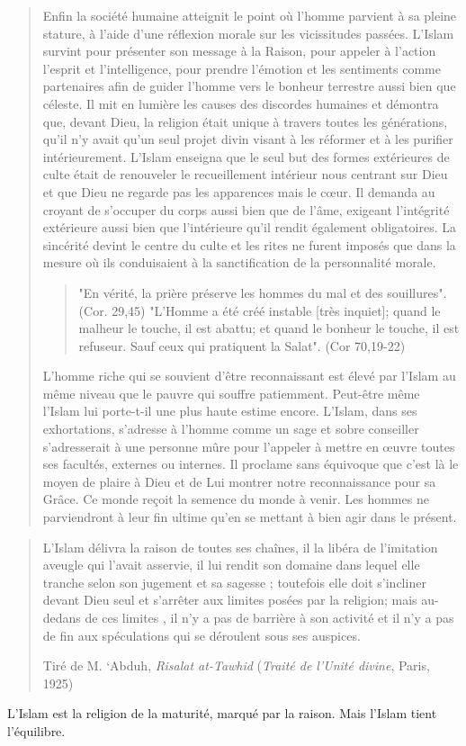 \begin{quote}
Enfin la société humaine atteignit le point où l'homme parvient à sa
pleine stature, à l'aide d'une réflexion morale sur les vicissitudes
passées. L'Islam survint pour présenter son message à la Raison, pour
appeler à l'action l'esprit et l'intelligence, pour prendre l'émotion et
les sentiments comme partenaires afin de guider l'homme vers le bonheur
terrestre aussi bien que céleste. Il mit en lumière les causes des
discordes humaines et démontra que, devant Dieu, la religion était
unique à travers toutes les générations, qu'il n'y avait qu'un seul
projet divin visant à les réformer et à les purifier intérieurement.
L'Islam enseigna que le seul but des formes extérieures de culte était
de renouveler le recueillement intérieur nous centrant sur Dieu et que
Dieu ne regarde pas les apparences mais le cœur. Il demanda au croyant
de s'occuper du corps aussi bien que de l'âme, exigeant l'intégrité
extérieure aussi bien que l'intérieure qu'il rendit également
obligatoires. La sincérité devint le centre du culte et les rites ne
furent imposés que dans la mesure où ils conduisaient à la
sanctification de la personnalité morale.
\begin{quote}
    "En vérité, la prière préserve
les hommes du mal et des souillures". (Cor. 29,45) "L'Homme a été créé
instable {[}très inquiet{]}; quand le malheur le touche, il est abattu;
et quand le bonheur le touche, il est refuseur. Sauf ceux qui pratiquent
la Salat". (Cor 70,19-22) 
\end{quote} 
L'homme riche qui se souvient d'être
reconnaissant est élevé par l'Islam au même niveau que le pauvre qui
souffre patiemment. Peut-être même l'Islam lui porte-t-il une plus haute
estime encore. L'Islam, dans ses exhortations, s'adresse à l'homme comme
un sage et sobre conseiller s'adresserait à une personne mûre pour
l'appeler à mettre en œuvre toutes ses facultés, externes ou internes.
Il proclame sans équivoque que c'est là le moyen de plaire à Dieu et de
Lui montrer notre reconnaissance pour sa Grâce. Ce monde reçoit la
semence du monde à venir. Les hommes ne parviendront à leur fin ultime
qu'en se mettant à bien agir dans le présent.
\end{quote}


\begin{quote}

L'Islam délivra la raison de toutes ses chaînes, il la libéra de
l'imitation aveugle qui l'avait asservie, il lui rendit son domaine dans
lequel elle tranche selon son jugement et sa sagesse ; toutefois elle
doit s'incliner devant Dieu seul et s'arrêter aux limites posées par la
religion; mais au-dedans de ces limites , il n'y a pas de barrière à son
activité et il n'y a pas de fin aux spéculations qui se déroulent sous
ses auspices.

Tiré de M. `Abduh, \emph{Risalat at-Tawhid} (\emph{Traité de l'Unité
divine}, Paris, 1925)
\end{quote}
\begin{Synthesis}
L'Islam est la religion de la maturité, marqué par la raison. Mais l'Islam tient l'équilibre. 
\end{Synthesis}

